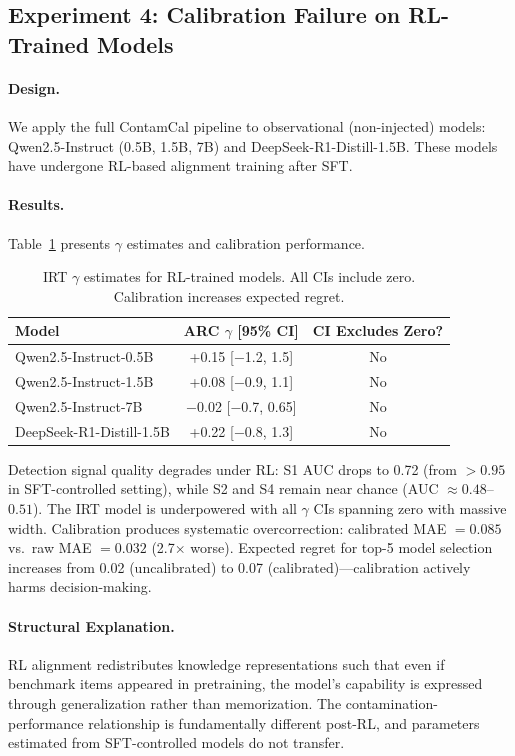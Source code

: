 \documentclass[11pt,a4paper]{article}
\begin{document}
\subsection{Experiment 4: Calibration Failure on RL-Trained Models}
\label{sec:exp-rl}

\paragraph{Design.} We apply the full ContamCal pipeline to observational (non-injected) models: Qwen2.5-Instruct (0.5B, 1.5B, 7B) and DeepSeek-R1-Distill-1.5B. These models have undergone RL-based alignment training after SFT.

\paragraph{Results.} Table~\ref{tab:rl} presents $\gamma$ estimates and calibration performance.

\begin{table}[h]
\centering
\caption{IRT $\gamma$ estimates for RL-trained models. All CIs include zero. Calibration increases expected regret.}
\label{tab:rl}
\begin{tabular}{lcc}
\toprule
Model & ARC $\gamma$ [95\% CI] & CI Excludes Zero? \\
\midrule
Qwen2.5-Instruct-0.5B & +0.15 [$-$1.2, 1.5] & No \\
Qwen2.5-Instruct-1.5B & +0.08 [$-$0.9, 1.1] & No \\
Qwen2.5-Instruct-7B & $-$0.02 [$-$0.7, 0.65] & No \\
DeepSeek-R1-Distill-1.5B & +0.22 [$-$0.8, 1.3] & No \\
\bottomrule
\end{tabular}
\end{table}

Detection signal quality degrades under RL: S1 AUC drops to 0.72 (from $>0.95$ in SFT-controlled setting), while S2 and S4 remain near chance (AUC $\approx 0.48$--$0.51$). The IRT model is underpowered with all $\gamma$ CIs spanning zero with massive width. Calibration produces systematic overcorrection: calibrated MAE $= 0.085$ vs.\ raw MAE $= 0.032$ (2.7$\times$ worse). Expected regret for top-5 model selection increases from 0.02 (uncalibrated) to 0.07 (calibrated)---calibration actively harms decision-making.

\paragraph{Structural Explanation.} RL alignment redistributes knowledge representations such that even if benchmark items appeared in pretraining, the model's capability is expressed through generalization rather than memorization. The contamination-performance relationship is fundamentally different post-RL, and parameters estimated from SFT-controlled models do not transfer.
\end{document}

